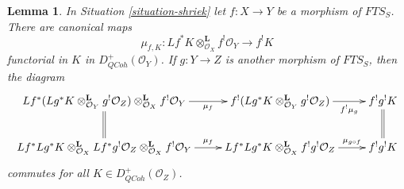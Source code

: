 \documentclass{stacks-project}
\theoremstyle{plain}
\newtheorem{lemma}[subsection]{Lemma}
\theoremstyle{definition}
\theoremstyle{remark}
\numberwithin{equation}{subsection}
\def\QCoh{\mathit{QCoh}}
\begin{document}
\begin{lemma}
\label{lemma-map-pullback-to-shriek-well-defined}
In Situation \ref{situation-shriek} let
$f : X \to Y$ be a morphism of $\textit{FTS}_S$. There are canonical maps
$$
\mu_{f, K} :
Lf^*K \otimes_{\mathcal{O}_X}^\mathbf{L} f^!\mathcal{O}_Y
\longrightarrow
f^!K
$$
functorial in $K$ in $D^+_\QCoh(\mathcal{O}_Y)$.
If $g : Y \to Z$ is another morphism of $\textit{FTS}_S$, then
the diagram
$$
\xymatrix{
Lf^*(Lg^*K \otimes_{\mathcal{O}_Y}^\mathbf{L} g^!\mathcal{O}_Z)
\otimes_{\mathcal{O}_X}^\mathbf{L} f^!\mathcal{O}_Y
\ar@{=}[d] \ar[r]_-{\mu_f} &
f^!(Lg^*K \otimes_{\mathcal{O}_Y}^\mathbf{L} g^!\mathcal{O}_Z)
\ar[r]_-{f^!\mu_g} &
f^!g^!K \ar@{=}[d] \\
Lf^*Lg^*K \otimes_{\mathcal{O}_X}^\mathbf{L} Lf^* g^!\mathcal{O}_Z
\otimes_{\mathcal{O}_X}^\mathbf{L} f^!\mathcal{O}_Y \ar[r]^-{\mu_f} &
Lf^*Lg^*K \otimes_{\mathcal{O}_X}^\mathbf{L} f^!g^!\mathcal{O}_Z
\ar[r]^-{\mu_{g \circ f}} & f^!g^!K
}
$$
commutes for all $K \in D^+_\QCoh(\mathcal{O}_Z)$.
\end{lemma}
\end{document}
